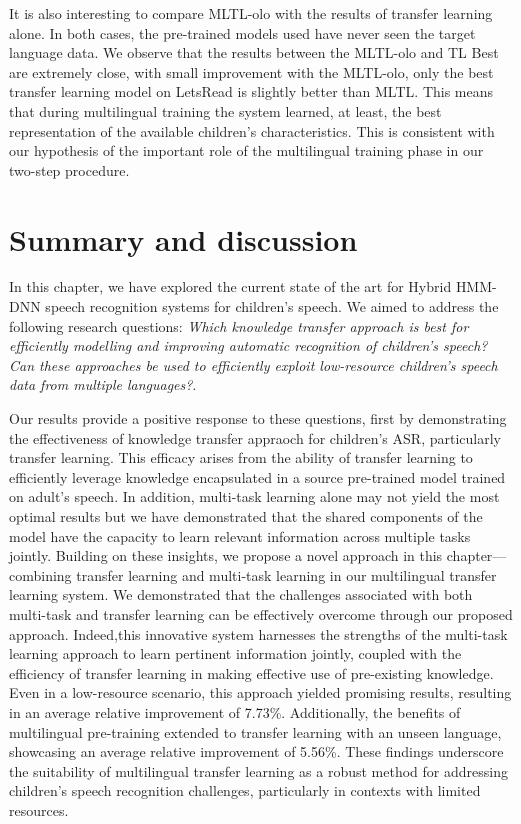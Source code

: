 It is also interesting to compare \ac{MLTL-olo} with the results of transfer learning alone. In both cases, the pre-trained models used have never seen the target language data. We observe that the results between the \ac{MLTL-olo} and \ac{TL} Best are extremely close, with small improvement with the \ac{MLTL-olo}, only the best transfer learning model on LetsRead is slightly better than \ac{MLTL}. This means that during multilingual training the system learned, at least, the best representation of the available children's characteristics. This is consistent with our hypothesis of the important role of the multilingual training phase in our two-step procedure.

\section{Summary and discussion}
In this chapter, we have explored the current state of the art for Hybrid \ac{HMM-DNN} speech recognition systems for children's speech. We aimed to address the following research questions: \textit{Which knowledge transfer approach is best for efficiently modelling and improving automatic recognition of children's speech? Can these approaches be used to efficiently exploit low-resource children's speech data from multiple languages?}.

Our results provide a positive response to these questions, first by demonstrating the effectiveness of knowledge transfer appraoch for children's \ac{ASR}, particularly transfer learning. This efficacy arises from the ability of transfer learning to efficiently leverage knowledge encapsulated in a source pre-trained model trained on adult's speech. In addition, multi-task learning alone may not yield the most optimal results but we have demonstrated that the shared components of the model have the capacity to learn relevant information across multiple tasks jointly. Building on these insights, we propose a novel approach in this chapter—combining transfer learning and multi-task learning in our multilingual transfer learning system. We demonstrated that the challenges associated with both multi-task and transfer learning can be effectively overcome through our proposed approach. Indeed,this innovative system harnesses the strengths of the multi-task learning approach to learn pertinent information jointly, coupled with the efficiency of transfer learning in making effective use of pre-existing knowledge. Even in a low-resource scenario, this approach yielded promising results, resulting in an average relative improvement of 7.73\%. Additionally, the benefits of multilingual pre-training extended to transfer learning with an unseen language, showcasing an average relative improvement of 5.56\%. These findings underscore the suitability of multilingual transfer learning as a robust method for addressing children's speech recognition challenges, particularly in contexts with limited resources.

